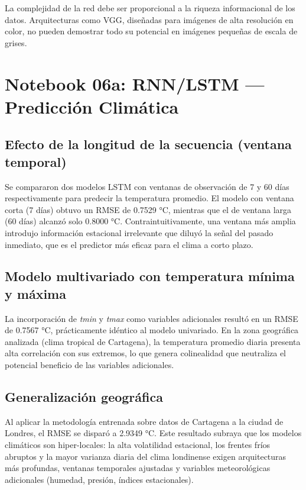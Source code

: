 \documentclass[12pt, a4paper]{article}
\begin{document}
La complejidad de la red debe ser proporcional a la riqueza informacional de los datos. Arquitecturas como VGG, diseñadas para imágenes de alta resolución en color, no pueden demostrar todo su potencial en imágenes pequeñas de escala de grises.

\section{Notebook 06a: RNN/LSTM --- Predicción Climática}

\subsection{Efecto de la longitud de la secuencia (ventana temporal)}

Se compararon dos modelos LSTM con ventanas de observación de 7 y 60 días respectivamente para predecir la temperatura promedio. El modelo con ventana corta (7 días) obtuvo un RMSE de 0.7529 °C, mientras que el de ventana larga (60 días) alcanzó solo 0.8000 °C. Contraintuitivamente, una ventana más amplia introdujo información estacional irrelevante que diluyó la señal del pasado inmediato, que es el predictor más eficaz para el clima a corto plazo.

\newpage
\subsection{Modelo multivariado con temperatura mínima y máxima}

La incorporación de \textit{tmin} y \textit{tmax} como variables adicionales resultó en un RMSE de 0.7567 °C, prácticamente idéntico al modelo univariado. En la zona geográfica analizada (clima tropical de Cartagena), la temperatura promedio diaria presenta alta correlación con sus extremos, lo que genera colinealidad que neutraliza el potencial beneficio de las variables adicionales.

\subsection{Generalización geográfica}

Al aplicar la metodología entrenada sobre datos de Cartagena a la ciudad de Londres, el RMSE se disparó a 2.9349 °C. Este resultado subraya que los modelos climáticos son hiper-locales: la alta volatilidad estacional, los frentes fríos abruptos y la mayor varianza diaria del clima londinense exigen arquitecturas más profundas, ventanas temporales ajustadas y variables meteorológicas adicionales (humedad, presión, índices estacionales).
\end{document}
